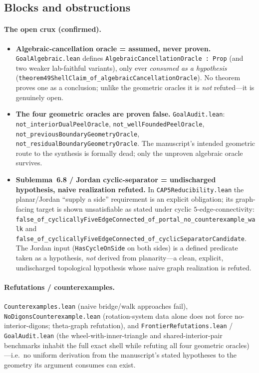 \subsection{Blocks and obstructions}
\label{sec:fc-blocks}

\paragraph{The open crux (confirmed).}
\begin{itemize}
  \item \textbf{Algebraic-cancellation oracle = assumed, never proven.}
  \texttt{GoalAlgebraic.lean} defines \texttt{AlgebraicCancellationOracle :
  Prop} (and two weaker lab-faithful variants), only ever \emph{consumed as a
  hypothesis} (\texttt{theorem49ShellClaim\_of\_algebraicCancellationOracle}).
  No theorem proves one as a conclusion; unlike the geometric oracles it is
  \emph{not} refuted---it is genuinely open.
  \item \textbf{The four geometric oracles are proven false.}
  \texttt{GoalAudit.lean}: \texttt{not\_interiorDualPeelOracle},
  \texttt{not\_wellFoundedPeelOracle},
  \texttt{not\_previousBoundaryGeometryOracle},
  \texttt{not\_residualBoundaryGeometryOracle}. The manuscript's intended
  geometric route to the synthesis is formally dead; only the unproven algebraic
  oracle survives.
  \item \textbf{Sublemma~6.8 / Jordan cyclic-separator = undischarged
  hypothesis, naive realization refuted.} In \texttt{CAP5Reducibility.lean} the
  planar/Jordan ``supply a side'' requirement is an explicit obligation; its
  graph-facing target is shown unsatisfiable as stated under cyclic
  $5$-edge-connectivity:
  \texttt{false\_of\_cyclicallyFiveEdgeConnected\_of\_portal\_no\_counterexample\_walk}
  and
  \texttt{false\_of\_cyclicallyFiveEdgeConnected\_of\_cyclicSeparatorCandidate}.
  The Jordan input (\texttt{HasCycleOnSide} on both sides) is a defined predicate
  taken as a hypothesis, \emph{not} derived from planarity---a clean, explicit,
  undischarged topological hypothesis whose naive graph realization is refuted.
\end{itemize}

\paragraph{Refutations / counterexamples.}
\texttt{Counterexamples.lean} (naive bridge/walk approaches fail),
\texttt{NoDigonsCounterexample.lean} (rotation-system data alone does not force
no-interior-digons; theta-graph refutation), and
\texttt{FrontierRefutations.lean} / \texttt{GoalAudit.lean} (the
wheel-with-inner-triangle and shared-interior-pair benchmarks inhabit the full
exact shell while refuting all four geometric oracles)---i.e.\ no uniform
derivation from the manuscript's stated hypotheses to the geometry its argument
consumes can exist.

